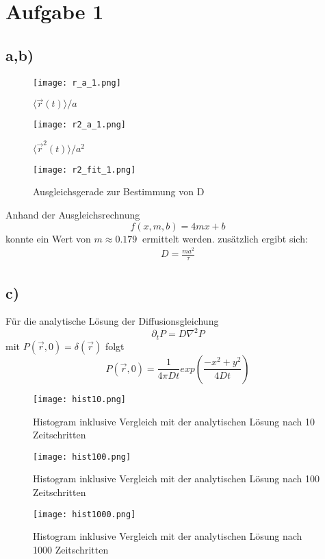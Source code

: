 \documentclass[paper=a4, ngerman]{scrartcl}
\begin{document}
\section{Aufgabe 1}
\subsection{a,b)}
\begin{figure}[htbp]
	\centering
	\texttt{[image: r\_a\_1.png]}
	\caption{$\langle \vec{r}(t)\rangle / a$}
	\label{fig:label}
\end{figure}
\begin{figure}[htbp]
	\centering
	\texttt{[image: r2\_a\_1.png]}
	\caption{$\langle \vec{r}^2(t)\rangle / a^2$}
	\label{fig:label}
\end{figure}
\begin{figure}[htbp]
	\centering
	\texttt{[image: r2\_fit\_1.png]}
	\caption{Ausgleichsgerade zur Bestimmung von D}
	\label{fig:label}
\end{figure}
Anhand der Ausgleichsrechnung 
\begin{equation}
	f(x,m,b) = 4mx+b
\end{equation} 
konnte ein Wert von $m \approx \SI{0.179}{}$ ermittelt werden.
zusätzlich ergibt sich:
\begin{align}
D = \frac{ma^2}{\tau}
\end{align}

\FloatBarrier
\subsection{c)}
Für die analytische Lösung der Diffusionsgleichung 
\begin{equation}
\partial_tP=D\nabla^2P
\end{equation}
mit $P(\vec{r},0)=\delta(\vec{r})$ folgt
\begin{equation}
	P(\vec{r},0) = \frac{1}{4\pi D t}exp(\frac{-x^2+y^2}{4Dt})
\end{equation}
\begin{figure}[htbp]
	\centering
	\texttt{[image: hist10.png]}
	\caption{Histogram inklusive Vergleich mit der analytischen Lösung nach 10 Zeitschritten}
\end{figure}
\begin{figure}[htbp]
	\centering
	\texttt{[image: hist100.png]}
	\caption{Histogram inklusive Vergleich mit der analytischen Lösung nach 100 Zeitschritten}
\end{figure}
\begin{figure}[htbp]
	\centering
	\texttt{[image: hist1000.png]}
	\caption{Histogram inklusive Vergleich mit der analytischen Lösung nach 1000 Zeitschritten}
\end{figure}
\FloatBarrier
\end{document}
